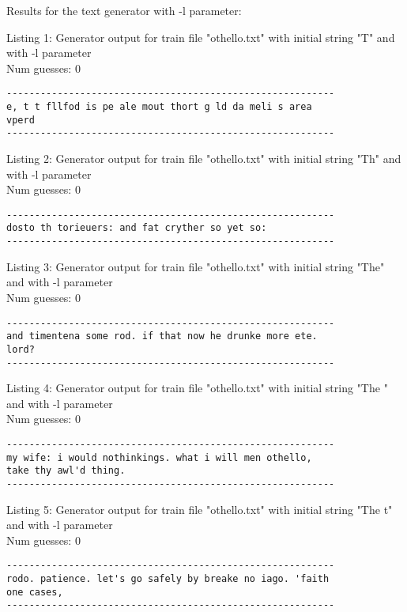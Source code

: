 \documentclass{article}
\begin{document}
Results for the text generator with -l parameter:


\hfill

Listing 1: Generator output for train file "othello.txt" with initial string "T" and with -l parameter
\\Num guesses: 0

\begin{lstlisting}
----------------------------------------------------------
e, t t fllfod is pe ale mout thort g ld da meli s area 
vperd
----------------------------------------------------------
\end{lstlisting}

Listing 2: Generator output for train file "othello.txt" with initial string "Th" and with -l parameter
\\Num guesses: 0

\begin{lstlisting}
----------------------------------------------------------
dosto th torieuers: and fat cryther so yet so:
----------------------------------------------------------
\end{lstlisting}

Listing 3: Generator output for train file "othello.txt" with initial string "The" and with -l parameter
\\Num guesses: 0

\begin{lstlisting}
----------------------------------------------------------
and timentena some rod. if that now he drunke more ete. 
lord?
----------------------------------------------------------
\end{lstlisting}

Listing 4: Generator output for train file "othello.txt" with initial string "The " and with -l parameter
\\Num guesses: 0

\begin{lstlisting}
----------------------------------------------------------
my wife: i would nothinkings. what i will men othello, 
take thy awl'd thing.
----------------------------------------------------------
\end{lstlisting}

Listing 5: Generator output for train file "othello.txt" with initial string "The t" and with -l parameter
\\Num guesses: 0

\begin{lstlisting}
----------------------------------------------------------
rodo. patience. let's go safely by breake no iago. 'faith 
one cases,
----------------------------------------------------------
\end{lstlisting}
\end{document}
